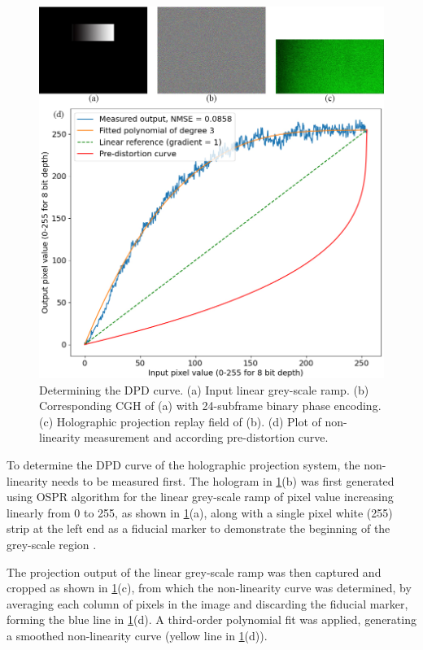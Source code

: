 \begin{figure}[H]
    \centering
    \includegraphics[width=\textwidth]{Determining_the_DPD_curve.jpg}
    \caption{Determining the DPD curve. (a) Input linear grey-scale ramp. (b) Corresponding CGH of (a) with 24-subframe binary phase encoding. (c) Holographic projection replay field of (b). (d) Plot of non-linearity measurement and according pre-distortion curve.}
    \label{fig:Determining_the_DPD_curve}
\end{figure}

To determine the DPD curve of the holographic projection system, the non-linearity needs to be measured first. The hologram in \cref{fig:Determining_the_DPD_curve}(b) was first generated using OSPR algorithm for the linear grey-scale ramp of pixel value increasing linearly from 0 to 255, as shown in \cref{fig:Determining_the_DPD_curve}(a), along with a single pixel white (255) strip at the left end as a fiducial marker to demonstrate the beginning of the grey-scale region \cite{Cable2006}.

The projection output of the linear grey-scale ramp was then captured and cropped as shown in \cref{fig:Determining_the_DPD_curve}(c), from which the non-linearity curve was determined, by averaging each column of pixels in the image and discarding the fiducial marker, forming the blue line in \cref{fig:Determining_the_DPD_curve}(d). A third-order polynomial fit was applied, generating a smoothed non-linearity curve (yellow line in \cref{fig:Determining_the_DPD_curve}(d)).

